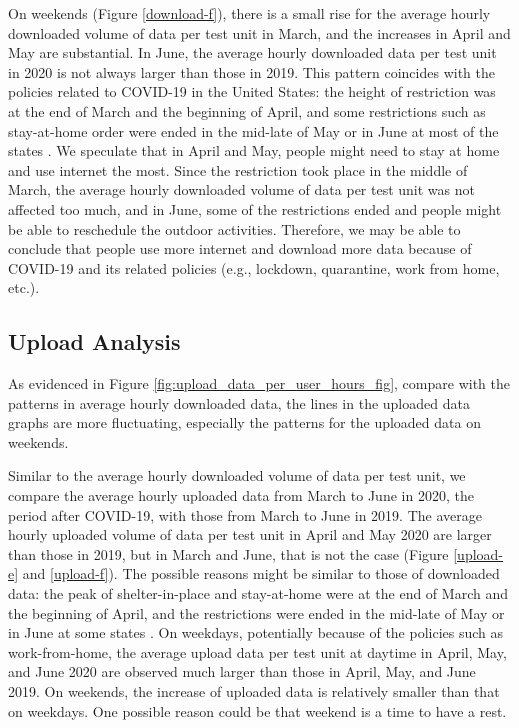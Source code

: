 On weekends (Figure \ref{download-f}), there is a small rise for the average hourly downloaded volume of data per test unit in March, and the increases in April and May are substantial. In June, the average hourly downloaded data per test unit in 2020 is not always larger than those in 2019. This pattern coincides with the policies related to COVID-19 in the United States: the height of restriction was at the end of March and the beginning of April, and some restrictions such as stay-at-home order were ended in the mid-late of May or in June at most of the states \cite{covid19restriction}. We speculate that in April and May, people might need to stay at home and use internet the most. Since the restriction took place in the middle of March, the average hourly downloaded volume of data per test unit was not affected too much, and in June, some of the restrictions ended and people might be able to reschedule the outdoor activities. Therefore, we may be able to conclude that people use more internet and download more data because of COVID-19 and its related policies (e.g., lockdown, quarantine, work from home, etc.). 

\subsection{Upload Analysis}
\label{sec:upload-analysis}

As evidenced in Figure \ref{fig:upload_data_per_user_hours_fig}, compare with the patterns in average hourly downloaded data, the lines in the uploaded data graphs are more fluctuating, especially the patterns for the uploaded data on weekends.

Similar to the average hourly downloaded volume of data per test unit, we compare the average hourly uploaded data from March to June in 2020, the period after COVID-19, with those from March to June in 2019. The average hourly uploaded volume of data per test unit in April and May 2020 are larger than those in 2019, but in March and June, that is not the case (Figure \ref{upload-e} and \ref{upload-f}). The possible reasons might be similar to those of downloaded data: the peak of shelter-in-place and stay-at-home were 
at the end of March and the beginning of April, and the restrictions were ended in the mid-late of May or in June at some states \cite{covid19restriction}. On weekdays, potentially because of the policies such as work-from-home, the average upload data per test unit at daytime in April, May, and June 2020 are observed much larger than those in April, May, and June 2019. On weekends, the increase of uploaded data is relatively smaller than that on weekdays. One possible reason could be that weekend is a time to have a rest.  